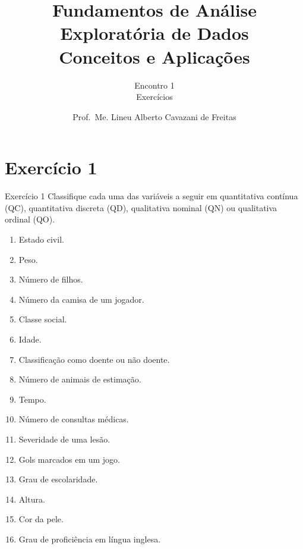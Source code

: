 \documentclass[
  ignorenonframetext,
  serif,
  professionalfont,
  usenames,
  dvipsnames,
  aspectratio = 169]{beamer}
\title{\hfill\break
\textbf{Fundamentos de Análise Exploratória de Dados}\\
Conceitos e Aplicações}
\subtitle{\hfill\break
Encontro 1\\
Exercícios}
\author{Prof.~Me. Lineu Alberto Cavazani de Freitas \vspace{-0.5cm}}
\date{}
\providecommand{\tightlist}{%
  \setlength{\itemsep}{0pt}\setlength{\parskip}{0pt}}
\renewcommand{\tightlist}{%
  \setlength{\itemsep}{0\baselineskip}
  \setlength{\parskip}{0.25\baselineskip}
}
\def\beginAHalfColumn{\begin{minipage}{0.49\textwidth}}%
\def\endColumns{\end{minipage}}%
\begin{document}
\frame{\titlepage}

\section{Exercício 1}\label{exercuxedcio-1}

\begin{frame}{Exercício 1}
\label{exercuxedcio-1-1}
Classifique cada uma das variáveis a seguir em quantitativa contínua
(QC), quantitativa discreta (QD), qualitativa nominal (QN) ou
qualitativa ordinal (QO).

\vspace{0.3cm}

\beginAHalfColumn

\begin{enumerate}
\tightlist
\item
  Estado civil.
\item
  Peso.
\item
  Número de filhos.
\item
  Número da camisa de um jogador.
\item
  Classe social.
\item
  Idade.
\item
  Classificação como doente ou não doente.
\item
  Número de animais de estimação.
\end{enumerate}

\endColumns
\beginAHalfColumn

\begin{enumerate}
\setcounter{enumi}{8}
\tightlist
\item
  Tempo.
\item
  Número de consultas médicas.
\item
  Severidade de uma lesão.
\item
  Gols marcados em um jogo.
\item
  Grau de escolaridade.
\item
  Altura.
\item
  Cor da pele.
\item
  Grau de proficiência em língua inglesa.
\end{enumerate}

\endColumns
\end{frame}
\end{document}
